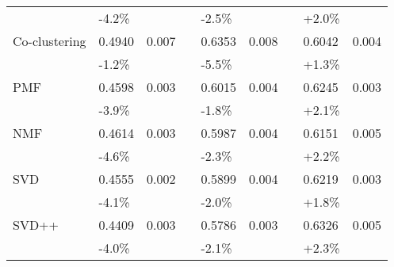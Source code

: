 \begin{sidewaystable}
\begin{tabular}{l ll l ll l ll}
              & \textcolor{scw-teal-darker}{-4.2\%} &&& \textcolor{scw-teal-darker}{-2.5\%}
                      &&& \textcolor{scw-teal-darker}{+2.0\%} \\
    Co-clustering & 0.4940 & 0.007 && 0.6353 & 0.008 && 0.6042 & 0.004 \\
              & \textcolor{scw-teal-darker}{-1.2\%} &&& \textcolor{scw-teal-darker}{-5.5\%}
                      &&& \textcolor{scw-teal-darker}{+1.3\%} \\
    PMF & 0.4598 & 0.003 && 0.6015 & 0.004 && 0.6245 & 0.003 \\
              & \textcolor{scw-teal-darker}{-3.9\%} &&& \textcolor{scw-teal-darker}{-1.8\%}
                      &&& \textcolor{scw-teal-darker}{+2.1\%} \\
    NMF & 0.4614 & 0.003 && 0.5987 & 0.004 && 0.6151 & 0.005 \\
              & \textcolor{scw-teal-darker}{-4.6\%} &&& \textcolor{scw-teal-darker}{-2.3\%}
                      &&& \textcolor{scw-teal-darker}{+2.2\%} \\
    SVD & 0.4555 & 0.002 && 0.5899 & 0.004 && 0.6219 & 0.003 \\
              & \textcolor{scw-teal-darker}{-4.1\%} &&& \textcolor{scw-teal-darker}{-2.0\%}
                      &&& \textcolor{scw-teal-darker}{+1.8\%} \\
    SVD++ & 0.4409 & 0.003 && 0.5786 & 0.003 && 0.6326 & 0.005\\
              & \textcolor{scw-teal-darker}{-4.0\%} &&& \textcolor{scw-teal-darker}{-2.1\%}
                      &&& \textcolor{scw-teal-darker}{+2.3\%} \\
    \end{tabular}
\end{sidewaystable}


